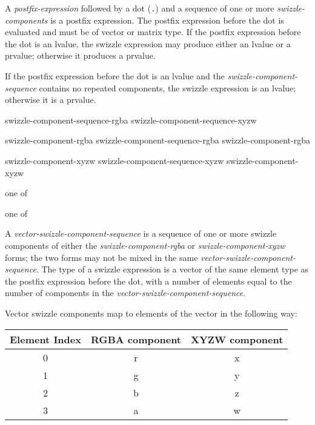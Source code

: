 \p A \textit{postfix-expression} followed by a dot (\texttt{.}) and a sequence
of one or more \textit{swizzle-components} is a postfix expression. The
postfix expression before the dot is evaluated and must be of vector or matrix type.
If the postfix expression before the dot is an lvalue, the swizzle expression may
produce either an lvalue or a prvalue; otherwise it produces a prvalue.


\p If the postfix expression before the dot is
an lvalue and the \textit{swizzle-component-sequence} contains no repeated
components, the swizzle expression is an lvalue; otherwise it is a prvalue.


\begin{grammar}
  \br
  swizzle-component-sequence-rgba\br
  swizzle-component-sequence-xyzw\br

  \br
  swizzle-component-rgba\br
  swizzle-component-sequence-rgba swizzle-component-rgba\br

  \br
  swizzle-component-xyzw\br
  swizzle-component-sequence-xyzw swizzle-component-xyzw\br

   \textnormal{one of}\br
  \br

   \textnormal{one of}\br
\end{grammar}

\p A \textit{vector-swizzle-component-sequence} is a sequence of one or more swizzle
components of either the \textit{swizzle-component-rgba} or
\textit{swizzle-component-xyzw} forms; the two forms may not be mixed in the
same \textit{vector-swizzle-component-sequence}. The type of a swizzle expression is a
vector of the same element type as the postfix expression before the dot, with a
number of elements equal to the number of components in the \textit{vector-swizzle-component-sequence}. 

\p Vector swizzle components map to elements of the vector in the following way:

\begin{center}
  \begin{tabular}{|| c | c | c ||}
    \hline
    Element Index & RGBA component & XYZW component \\
    \hline
    0 & r & x \\
    1 & g & y \\
    2 & b & z \\
    3 & a & w \\
    \hline
  \end{tabular}
\end{center}

